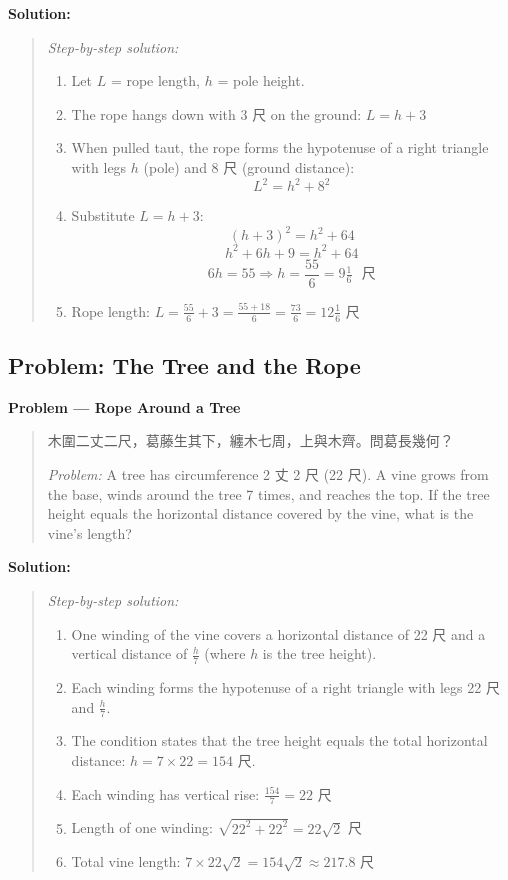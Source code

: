 \documentclass[11pt,a4paper]{article}
\newcommand{\zh}[1]{{#1}}
\newenvironment{chproblem}[1][]{%
  \par\medskip\noindent\textbf{\textcolor{sectioncolor}{#1}}\par\nopagebreak
  \begin{quote}\small
}{%
  \end{quote}\medskip
}
\newenvironment{chsolution}{%
  \par\medskip\noindent\textbf{\textcolor{notecolor}{Solution:}}\par\nopagebreak
  \begin{quote}\small
}{%
  \end{quote}\medskip
}
\newenvironment{stepbystep}{%
  \par\smallskip\noindent\textit{Step-by-step solution:}\par\nopagebreak
  \begin{enumerate}[leftmargin=2em,label=\textbf{Step \arabic*:},ref=\arabic*]
}{%
  \end{enumerate}\medskip
}
\begin{document}
\begin{chsolution}
\begin{stepbystep}
\item Let $L$ = rope length, $h$ = pole height.

\item The rope hangs down with 3 \zh{尺} on the ground: $L = h + 3$

\item When pulled taut, the rope forms the hypotenuse of a right triangle
with legs $h$ (pole) and 8 \zh{尺} (ground distance):
\[
L^2 = h^2 + 8^2
\]

\item Substitute $L = h + 3$:
\[
(h+3)^2 = h^2 + 64
\]
\[
h^2 + 6h + 9 = h^2 + 64
\]
\[
6h = 55 \Rightarrow h = \frac{55}{6} = 9\tfrac{1}{6} \text{ \zh{尺}}
\]

\item Rope length: $L = \frac{55}{6} + 3 = \frac{55 + 18}{6} = \frac{73}{6} = 12\tfrac{1}{6}$ \zh{尺}
\end{stepbystep}
\end{chsolution}

\subsection{Problem: The Tree and the Rope}

\begin{chproblem}[Problem --- Rope Around a Tree]
\zh{木圍二丈二尺，葛藤生其下，纏木七周，上與木齊。問葛長幾何？}

\medskip
\textit{Problem:} A tree has circumference 2 \zh{丈} 2 \zh{尺} (22 \zh{尺}). A
vine grows from the base, winds around the tree 7 times, and reaches the
top. If the tree height equals the horizontal distance covered by the vine,
what is the vine's length?
\end{chproblem}

\begin{chsolution}
\begin{stepbystep}
\item One winding of the vine covers a horizontal distance of 22 \zh{尺} and
a vertical distance of $\frac{h}{7}$ (where $h$ is the tree height).

\item Each winding forms the hypotenuse of a right triangle with legs 22
\zh{尺} and $\frac{h}{7}$.

\item The condition states that the tree height equals the total horizontal
distance: $h = 7 \times 22 = 154$ \zh{尺}.

\item Each winding has vertical rise: $\frac{154}{7} = 22$ \zh{尺}

\item Length of one winding: $\sqrt{22^2 + 22^2} = 22\sqrt{2}$ \zh{尺}

\item Total vine length: $7 \times 22\sqrt{2} = 154\sqrt{2} \approx 217.8$ \zh{尺}
\end{stepbystep}
\end{chsolution}
\end{document}
